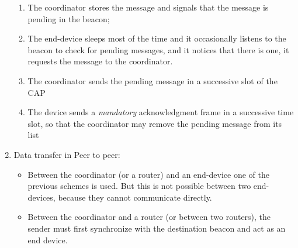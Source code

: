 \begin{enumerate}
   \begin{enumerate}
      \item The coordinator stores the message and signals that the message is pending in the beacon;
      \item The end-device sleeps most of the time and it occasionally listens to the beacon to check for pending messages, and it notices that there is one, it requests the message to the coordinator.
      \item The coordinator sends the pending message in a
      successive slot of the CAP
      \item The device sends a \textit{mandatory} acknowledgment frame in a successive time slot, so that the coordinator may remove the pending message from its list
   \end{enumerate}
   \item Data transfer in Peer to peer:
   \begin{itemize}
      \item Between the coordinator (or a router) and an end-device one of the previous schemes is used.
      But this is not possible between two end-devices, because they cannot communicate directly.
      \item Between the coordinator and a router (or between two routers), the sender must first synchronize with the destination beacon and
      act as an end device.
   \end{itemize}
\end{enumerate}

\newpage
